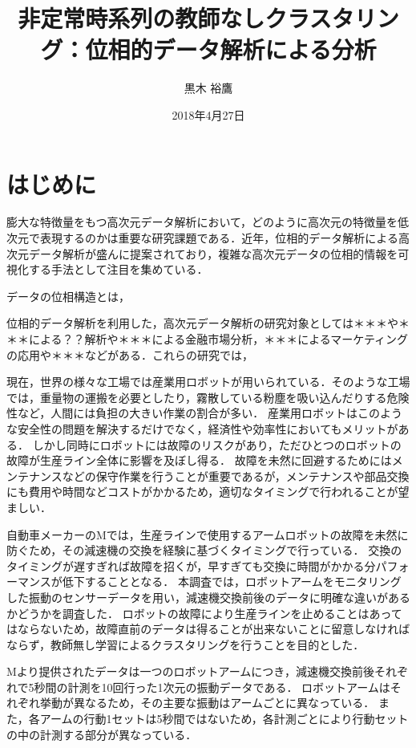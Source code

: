\documentclass{jarticle}
\title{非定常時系列の教師なしクラスタリング：位相的データ解析による分析}
\author{黒木 裕鷹}
\date{2018年4月27日}
\begin{document}
\maketitle
\section{はじめに}
膨大な特徴量をもつ高次元データ解析において，どのように高次元の特徴量を低次元で表現するのかは重要な研究課題である．近年，位相的データ解析による高次元データ解析が盛んに提案されており，複雑な高次元データの位相的情報を可視化する手法として注目を集めている．

データの位相構造とは，

位相的データ解析を利用した，高次元データ解析の研究対象としては＊＊＊や＊＊＊による？？解析や＊＊＊による金融市場分析，＊＊＊によるマーケティングの応用や＊＊＊などがある．これらの研究では，

現在，世界の様々な工場では産業用ロボットが用いられている．そのような工場では，重量物の運搬を必要としたり，霧散している粉塵を吸い込んだりする危険性など，人間には負担の大きい作業の割合が多い．
産業用ロボットはこのような安全性の問題を解決するだけでなく，経済性や効率性においてもメリットがある．
しかし同時にロボットには故障のリスクがあり，ただひとつのロボットの故障が生産ライン全体に影響を及ぼし得る．
故障を未然に回避するためにはメンテナンスなどの保守作業を行うことが重要であるが，メンテナンスや部品交換にも費用や時間などコストがかかるため，適切なタイミングで行われることが望ましい．


自動車メーカーのMでは，生産ラインで使用するアームロボットの故障を未然に防ぐため，その減速機の交換を経験に基づくタイミングで行っている．
交換のタイミングが遅すぎれば故障を招くが，早すぎても交換に時間がかかる分パフォーマンスが低下することとなる．
本調査では，ロボットアームをモニタリングした振動のセンサーデータを用い，減速機交換前後のデータに明確な違いがあるかどうかを調査した．
ロボットの故障により生産ラインを止めることはあってはならないため，故障直前のデータは得ることが出来ないことに留意しなければならず，教師無し学習によるクラスタリングを行うことを目的とした．


Mより提供されたデータは一つのロボットアームにつき，減速機交換前後それぞれで5秒間の計測を10回行った1次元の振動データである．
ロボットアームはそれぞれ挙動が異なるため，その主要な振動はアームごとに異なっている．
また，各アームの行動1セットは5秒間ではないため，各計測ごとにより行動セットの中の計測する部分が異なっている．
\end{document}
